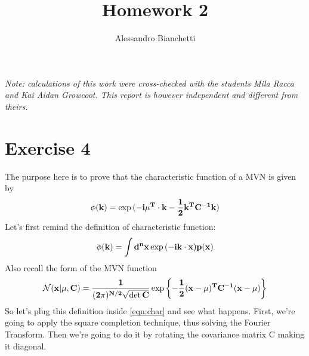 \documentclass[a4paper,11pt,fleqn]{article}
\title{Homework 2}
\author{Alessandro Bianchetti}
\begin{document}
\maketitle
\textit{Note: calculations of this work were cross-checked with the students Mila Racca and Kai Aidan Growcoot. 
This report is however independent and different from theirs.}

\section{Exercise 4}
The purpose here is to prove that the characteristic function of a MVN is given by
\begin{equation}
    \phi(\bf{k}) = \exp{(-i\mu^T\cdot \bf{k}-\frac{1}{2}\bf{k}^T C^{-1}\bf{k})}
\end{equation}
Let's first remind the definition of characteristic function:
\begin{equation}
    \label{eqn:char}
    \phi(\bf{k}) = \int d^nx \exp{(-i\bf{k}\cdot \bf{x} )p(\bf{x})}
\end{equation}
Also recall the form of the MVN function
\begin{equation}
    \mathcal{N}(\bf{x}|\bf{\mu}, C) = \frac{1}{(2\pi)^{N/2}\sqrt{\det{C}}} \exp{\left\{-\frac{1}{2}(\bf{x}-\bf{\mu})^T C^{-1} (\bf{x}-\bf{\mu})\right\}}
\end{equation}
So let's plug this definition inside \ref*{eqn:char} and see what happens. First,
we're going to apply the square completion technique, thus solving the Fourier Transform.
Then we're going to do it by rotating the covariance matrix C making it diagonal.
\end{document}
